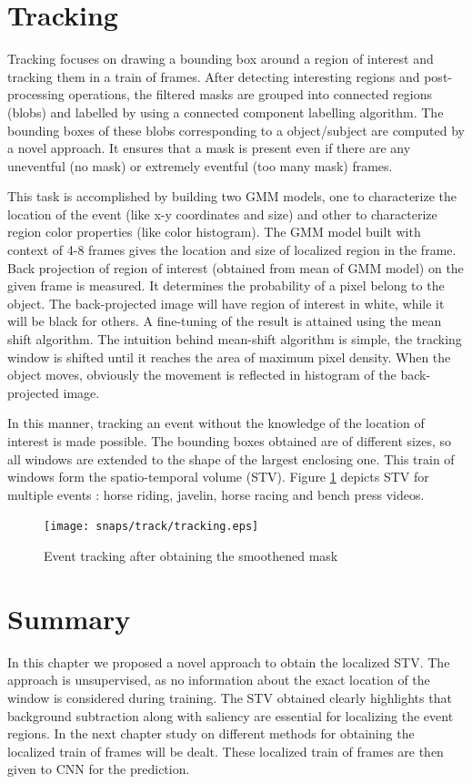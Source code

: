 \section{Tracking}
 \label{sec:trac}
Tracking focuses on drawing a bounding box around a region of interest and tracking them in a train of frames.  After detecting interesting regions and post-processing operations, the filtered masks are grouped into connected regions (blobs) and labelled by using a connected component labelling algorithm.  The bounding boxes of these blobs corresponding to a object/subject are computed by a novel approach.  It ensures that a mask is present even if there are any uneventful (no mask) or extremely eventful (too many mask) frames.
\par This task is accomplished by building two GMM models, one to characterize the location of the event (like x-y coordinates and size) and other to characterize region color properties (like color histogram).  The GMM model built with context of 4-8 frames gives the location and size of localized region in the frame.  Back projection \citep{backProj} of region of interest (obtained from mean of GMM model) on the given frame is measured. It determines the probability of a pixel belong to the object.  The back-projected image  will have region of interest in white, while it will be black for others.  A fine-tuning of the result is attained using the mean shift algorithm.  The intuition behind mean-shift algorithm is simple, the tracking window is shifted until it reaches the area of maximum pixel density.  When the object moves, obviously the movement is reflected in histogram of the back-projected image. 
\par In this manner, tracking an event without the knowledge of the location of interest is made possible.  The bounding boxes obtained are of different sizes, so all windows are extended to the shape of the largest enclosing one.  This train of  windows form the spatio-temporal volume (STV). Figure \ref{fig:tracking} depicts STV for multiple events : horse riding, javelin, horse racing and bench press videos.
\begin{figure}[htpb]
   \begin{center}
	    \texttt{[image: snaps/track/tracking.eps]}     
     \caption {Event tracking after obtaining the smoothened mask}
   \label{fig:tracking}
   \end{center}
 \end{figure}
\section{Summary}
In this chapter we proposed a novel approach to obtain the localized STV.  The approach is unsupervised, as no information about the exact location of the window is considered during training.  The STV obtained clearly highlights that background subtraction along with saliency are essential for localizing the event regions. In the next chapter study on different methods for obtaining the localized train of frames will be dealt.  These localized train of frames are then given to CNN for the prediction.